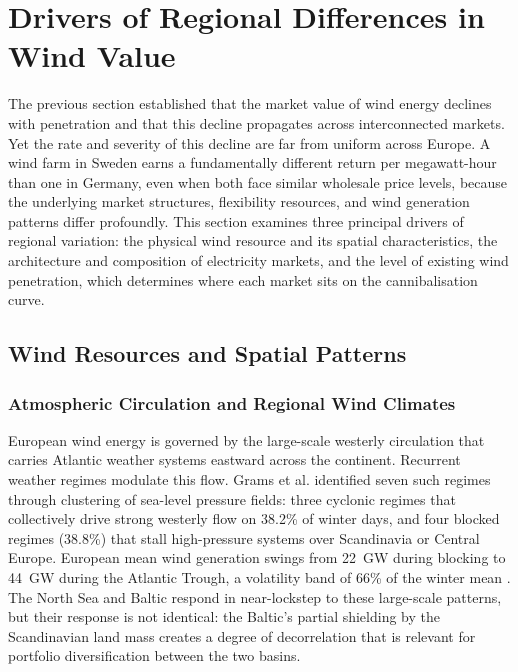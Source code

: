 \section{Drivers of Regional Differences in Wind Value}\label{sec:regional_drivers}

The previous section established that the market value of wind energy declines with penetration and that this decline propagates across interconnected markets. Yet the rate and severity of this decline are far from uniform across Europe. A wind farm in Sweden earns a fundamentally different return per megawatt-hour than one in Germany, even when both face similar wholesale price levels, because the underlying market structures, flexibility resources, and wind generation patterns differ profoundly. This section examines three principal drivers of regional variation: the physical wind resource and its spatial characteristics, the architecture and composition of electricity markets, and the level of existing wind penetration, which determines where each market sits on the cannibalisation curve.

\subsection{Wind Resources and Spatial Patterns}\label{sec:wind_resources}

\subsubsection{Atmospheric Circulation and Regional Wind Climates}\label{sec:wind_climates}

European wind energy is governed by the large-scale westerly circulation that carries Atlantic weather systems eastward across the continent. Recurrent weather regimes modulate this flow. Grams et al. \cite{Grams2017} identified seven such regimes through clustering of sea-level pressure fields: three cyclonic regimes that collectively drive strong westerly flow on 38.2\% of winter days, and four blocked regimes (38.8\%) that stall high-pressure systems over Scandinavia or Central Europe. European mean wind generation swings from 22~GW during blocking to 44~GW during the Atlantic Trough, a volatility band of 66\% of the winter mean \cite{Grams2017}. The North Sea and Baltic respond in near-lockstep to these large-scale patterns, but their response is not identical: the Baltic's partial shielding by the Scandinavian land mass creates a degree of decorrelation that is relevant for portfolio diversification between the two basins.

